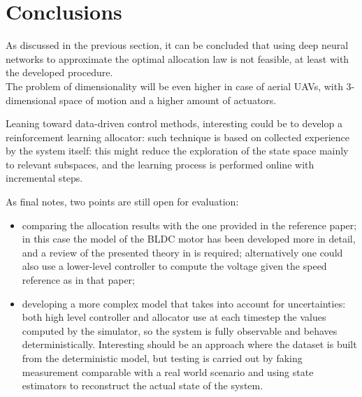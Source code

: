 \section{Conclusions} \label{sec:conclusions}
As discussed in the previous section, it can be concluded that using deep neural networks to approximate the optimal allocation law is not feasible, at least with the developed procedure. \\
The problem of dimensionality will be even higher in case of aerial UAVs, with 3-dimensional space of motion and a higher amount of actuators.

Leaning toward data-driven control methods, interesting could be to develop a reinforcement learning allocator: such technique is based on collected experience by the system itself: this might reduce the exploration of the state space mainly to relevant subspaces, and the learning process is performed online with incremental steps.

As final notes, two points are still open for evaluation:
\begin{itemize}
    \item comparing the allocation results with the one provided in the reference paper; in this case the model of the BLDC motor has been developed more in detail, and a review of the presented theory in \cite{rospo} is required; alternatively one could also use a lower-level controller to compute the voltage given the speed reference as in that paper;
    \item developing a more complex model that takes into account for uncertainties: both high level controller and allocator use at each timestep the values computed by the simulator, so the system is fully observable and behaves deterministically. Interesting should be an approach where the dataset is built from the deterministic model, but testing is carried out by faking measurement comparable with a real world scenario and using state estimators to reconstruct the actual state of the system.
\end{itemize}

